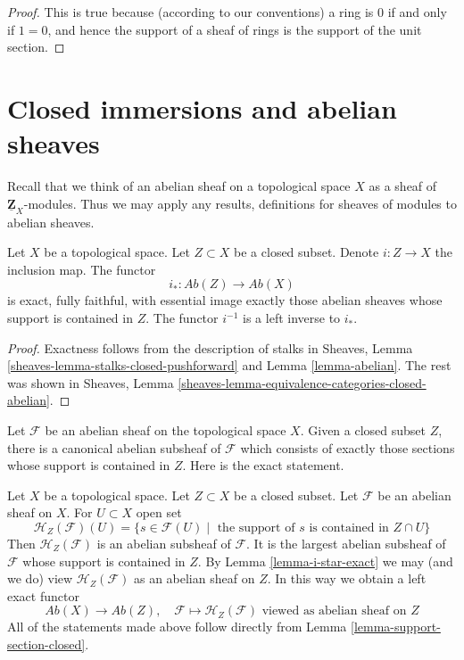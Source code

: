 \begin{proof}
This is true because (according to our conventions)
a ring is $0$ if and only if
$1 = 0$, and hence the support of a sheaf of rings
is the support of the unit section.
\end{proof}






\section{Closed immersions and abelian sheaves}
\label{section-closed-immersions}

\noindent
Recall that we think of an abelian sheaf on a topological space $X$ as a
sheaf of $\underline{\mathbf{Z}}_X$-modules. Thus we may apply any results,
definitions for sheaves of modules to abelian sheaves.

\begin{lemma}
\label{lemma-i-star-exact}
Let $X$ be a topological space. Let $Z \subset X$ be a closed subset.
Denote $i : Z \to X$ the inclusion map. The functor
$$
i_* : \textit{Ab}(Z) \longrightarrow \textit{Ab}(X)
$$
is exact, fully faithful, with essential image exactly those
abelian sheaves whose support is contained in $Z$. The functor $i^{-1}$
is a left inverse to $i_*$.
\end{lemma}

\begin{proof}
Exactness follows from the description of
stalks in Sheaves, Lemma \ref{sheaves-lemma-stalks-closed-pushforward}
and Lemma \ref{lemma-abelian}. The rest was shown in
Sheaves, Lemma \ref{sheaves-lemma-equivalence-categories-closed-abelian}.
\end{proof}

\noindent
Let $\mathcal{F}$ be an abelian sheaf on the topological space $X$. Given
a closed subset $Z$, there is a canonical abelian subsheaf of $\mathcal{F}$
which consists of exactly those sections whose support is contained in $Z$.
Here is the exact statement.

\begin{remark}
\label{remark-sections-support-in-closed}
Let $X$ be a topological space. Let $Z \subset X$ be a closed subset.
Let $\mathcal{F}$ be an abelian sheaf on $X$. For $U \subset X$ open set
$$
\mathcal{H}_Z(\mathcal{F})(U) =
\{s \in \mathcal{F}(U) \mid
\text{ the support of }s\text{ is contained in }Z \cap U\}
$$
Then $\mathcal{H}_Z(\mathcal{F})$ is an abelian subsheaf of $\mathcal{F}$.
It is the largest abelian subsheaf of $\mathcal{F}$ whose support is
contained in $Z$. By Lemma \ref{lemma-i-star-exact} we may (and we do)
view $\mathcal{H}_Z(\mathcal{F})$ as an abelian sheaf on $Z$.
In this way we obtain a left exact functor
$$
\textit{Ab}(X) \longrightarrow \textit{Ab}(Z),\quad
\mathcal{F} \longmapsto \mathcal{H}_Z(\mathcal{F})
\text{ viewed as abelian sheaf on }Z
$$
All of the statements made above follow directly from
Lemma \ref{lemma-support-section-closed}.
\end{remark}

